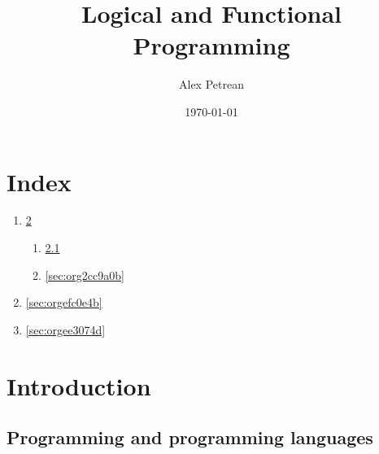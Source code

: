 \documentclass[11pt]{article}
\author{Alex Petrean}
\date{\today}
\title{Logical and Functional Programming}
\begin{document}
\maketitle
\tableofcontents


\section{Index}
\label{sec:org348d112}
\begin{enumerate}
\item \ref{sec:org05efcd8}
\begin{enumerate}
\item \ref{sec:org8a11219}
\item \ref{sec:org2cc9a0b}
\end{enumerate}
\item \ref{sec:orgefc0e4b}
\item \ref{sec:orgee3074d}
\end{enumerate}

\section{Introduction}
\label{sec:org05efcd8}
\subsection{Programming and programming languages}
\label{sec:org8a11219}
\end{document}
